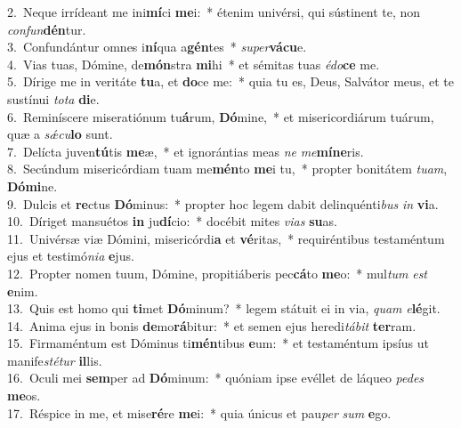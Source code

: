 {2.~}Neque irrídeant me ini\textbf{mí}ci \textbf{me}i:~* étenim univérsi, qui sústinent te, non \textit{con}\textit{fun}\textbf{dén}tur.\\
{3.~}Confundántur omnes i\textbf{ní}qua a\textbf{gén}tes~* \textit{su}\textit{per}\textbf{vá}\textbf{cu}e.\\
{4.~}Vias tuas, Dómine, de\textbf{món}stra \textbf{mi}hi~* et sémitas tuas \textit{é}\textit{do}\textbf{ce} me.\\
{5.~}Dírige me in veritáte \textbf{tu}a, et \textbf{do}ce me:~* quia tu es, Deus, Salvátor meus, et te sustínui \textit{to}\textit{ta} \textbf{di}e.\\
{6.~}Reminíscere miseratiónum tu\textbf{á}rum, \textbf{Dó}mine,~* et misericordiárum tuárum, quæ a \textit{sǽ}\textit{cu}\textbf{lo} sunt.\\
{7.~}Delícta juven\textbf{tú}tis \textbf{me}æ,~* et ignorántias meas \textit{ne} \textit{me}\textbf{mí}\textbf{ne}ris.\\
{8.~}Secúndum misericórdiam tuam me\textbf{mén}to \textbf{me}i tu,~* propter bonitátem \textit{tu}\textit{am}, \textbf{Dó}\textbf{mi}ne.\\
{9.~}Dulcis et \textbf{re}ctus \textbf{Dó}minus:~* propter hoc legem dabit delinquénti\textit{bus} \textit{in} \textbf{vi}a.\\
{10.~}Díriget mansuétos \textbf{in} ju\textbf{dí}cio:~* docébit mites \textit{vi}\textit{as} \textbf{su}as.\\
{11.~}Univérsæ viæ Dómini, misericórdi\textbf{a} et \textbf{vé}ritas,~* requiréntibus testaméntum ejus et testimó\textit{ni}\textit{a} \textbf{e}jus.\\
{12.~}Propter nomen tuum, Dómine, propitiáberis pec\textbf{cá}to \textbf{me}o:~* mul\textit{tum} \textit{est} \textbf{e}nim.\\
{13.~}Quis est homo qui \textbf{ti}met \textbf{Dó}minum?~* legem státuit ei in via, \textit{quam} \textit{e}\textbf{lé}git.\\
{14.~}Anima ejus in bonis \textbf{de}mo\textbf{rá}bitur:~* et semen ejus heredi\textit{tá}\textit{bit} \textbf{ter}ram.\\
{15.~}Firmaméntum est Dóminus ti\textbf{mén}tibus \textbf{e}um:~* et testaméntum ipsíus ut manife\textit{sté}\textit{tur} \textbf{il}lis.\\
{16.~}Oculi mei \textbf{sem}per ad \textbf{Dó}minum:~* quóniam ipse evéllet de láqueo \textit{pe}\textit{des} \textbf{me}os.\\
{17.~}Réspice in me, et mise\textbf{ré}re \textbf{me}i:~* quia únicus et pau\textit{per} \textit{sum} \textbf{e}go.\\

